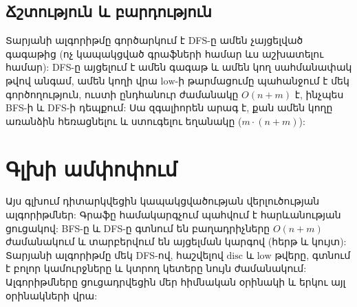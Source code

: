 \subsection{Ճշտություն և բարդություն}

Տարյանի ալգորիթմը գործարկում է DFS-ը ամեն չայցելված գագաթից (ոչ կապակցված գրաֆների համար ևս աշխատելու համար): DFS-ը այցելում է ամեն գագաթ և ամեն կող սահմանափակ թվով անգամ, ամեն կողի վրա $\mathrm{low}$-ի թարմացումը պահանջում է մեկ գործողություն, ուստի ընդհանուր ժամանակը $O(n+m)$ է, ինչպես BFS-ի և DFS-ի դեպքում: Սա զգալիորեն արագ է, քան ամեն կողը առանձին հեռացնելու և ստուգելու եղանակը ($m\cdot(n+m)$):

\section{Գլխի ամփոփում}

Այս գլխում դիտարկվեցին կապակցվածության վերլուծության ալգորիթմներ: Գրաֆը համակարգչում պահվում է հարևանության ցուցակով: BFS-ը և DFS-ը գտնում են բաղադրիչները $O(n+m)$ ժամանակում և տարբերվում են այցելման կարգով (հերթ և կույտ): Տարյանի ալգորիթմը մեկ DFS-ով, հաշվելով $\mathrm{disc}$ և $\mathrm{low}$ թվերը, գտնում է բոլոր կամուրջները և կտրող կետերը նույն ժամանակում: Ալգորիթմները ցուցադրվեցին մեր հիմնական օրինակի և երկու այլ օրինակների վրա:
